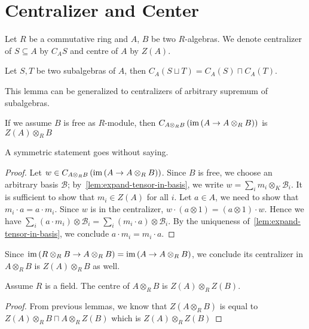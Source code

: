 \section{Centralizer and Center}
Let $R$ be a commutative ring and $A$, $B$ be two $R$-algebras. We denote centralizer of $S\subseteq A$ by $C_{A}S$ and centre of $A$ by $Z(A)$.

\begin{lemma}
  Let $S, T$ be two subalgebras of $A$, then $C_{A}(S\sqcup T)=C_{A}(S)\sqcap C_{A}(T)$.
  \leanok
\end{lemma}
This lemma can be generalized to centralizers of arbitrary supremum of subalgebras.

\begin{lemma}
  If we assume $B$ is free as $R$-module, then $C_{A\otimes_{R}B}\left(\operatorname{im}\left(A\to A\otimes_{R}B\right)\right)$ is $Z(A) \otimes_{R} B$
\end{lemma}
A symmetric statement goes without saying.
\begin{proof}
  Let $w\in C_{A\otimes_{R}B}\left(\operatorname{im}\left(A\to A\otimes_{R}B\right)\right)$. Since $B$ is free, we choose an arbitrary basis $\mathcal{B}$; by~\cref{lem:expand-tensor-in-basis}, we write $w = \sum_{i}m_{i}\otimes_{K}\mathcal{B}_{i}$. It is sufficient to show that $m_{i}\in Z(A)$ for all $i$. Let $a \in A$, we need to show that $m_{i}\cdot a = a \cdot m_{i}$. Since $w$ is in the centralizer, $w \cdot (a\otimes 1) = (a\otimes 1)\cdot w$. Hence we have $\sum_{i}(a\cdot m_{i})\otimes\mathcal{B}_{i}=\sum_{i}(m_{i}\cdot a)\otimes\mathcal{B}_{i}$. By the uniqueness of~\cref{lem:expand-tensor-in-basis}, we conclude $a\cdot m_{i}=m_{i}\cdot a$.
\end{proof}

\begin{remark}
  Since $\operatorname{im}\left(R\otimes_{R}B\to A\otimes_{R}B\right)=\operatorname{im}\left(A\to A\otimes_{R}B\right)$, we conclude its centralizer in $A\otimes_{R}B$ is $Z(A)\otimes_{R}B$ as well.
\end{remark}

\begin{lemma}
  \label{lem:center-tensor}
  Assume $R$ is a field. The centre of $A\otimes_{R} B$ is $Z\left(A\right)\otimes_{R}Z\left(B\right)$.
  \leanok
\end{lemma}
\begin{proof}
 From previous lemmas, we know that $Z\left(A\otimes_{R}B\right)$ is equal to $Z\left(A\right)\otimes_{R}B \sqcap A\otimes_{R}Z\left(B\right)$ which is $Z\left(A\right)\otimes_{R}Z\left(B\right)$
\end{proof}

